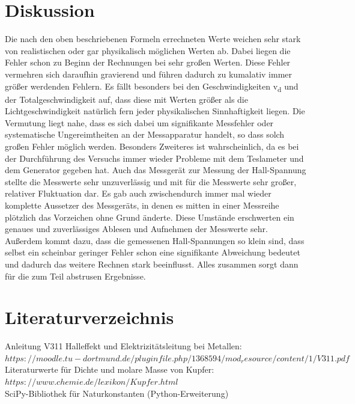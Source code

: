 \documentclass[titlepage=firstcover, captions=tableheading]{scrartcl}
\begin{document}
\section{Diskussion}
Die nach den oben beschriebenen Formeln errechneten Werte weichen sehr stark von realistischen oder gar physikalisch möglichen Werten ab. Dabei liegen die Fehler schon zu Beginn der Rechnungen bei sehr großen Werten. Diese Fehler vermehren sich daraufhin gravierend und führen dadurch zu kumalativ immer größer werdenden Fehlern. Es fällt besonders bei den Geschwindigkeiten v\textsubscript{d} und der Totalgeschwindigkeit auf, dass diese mit Werten größer als die Lichtgeschwindigkeit natürlich fern jeder physikalischen Sinnhaftigkeit liegen. Die Vermutung liegt nahe, dass es sich dabei um signifikante Messfehler oder systematische Ungereimtheiten an der Messapparatur handelt, so dass solch großen Fehler möglich werden. Besonders Zweiteres ist wahrscheinlich, da es bei der Durchführung des Versuchs immer wieder Probleme mit dem Teslameter und dem Generator gegeben hat. Auch das Messgerät zur Messung der Hall-Spannung stellte die Messwerte sehr unzuverlässig und mit für die Messwerte sehr großer, relativer Fluktuation dar. Es gab auch zwischendurch immer mal wieder komplette Aussetzer des Messgeräts, in denen es mitten in einer Messreihe plötzlich das Vorzeichen ohne Grund änderte. Diese Umstände erschwerten ein genaues und zuverlässiges Ablesen und Aufnehmen der Messwerte sehr. Außerdem kommt dazu, dass die gemessenen Hall-Spannungen so klein sind, dass selbst ein scheinbar geringer Fehler schon eine signifikante Abweichung bedeutet und dadurch das weitere Rechnen stark beeinflusst. Alles zusammen sorgt dann für die zum Teil abstrusen Ergebnisse.

\section{Literaturverzeichnis}
Anleitung V311 Halleffekt und Elektrizitätsleitung bei Metallen: $https://moodle.tu-dortmund.de/pluginfile.php/1368594/mod_resource/content/1/V311.pdf$\\
Literaturwerte für Dichte und molare Masse von Kupfer: $https://www.chemie.de/lexikon/Kupfer.html$\\
SciPy-Bibliothek für Naturkonstanten (Python-Erweiterung)
\end{document}
